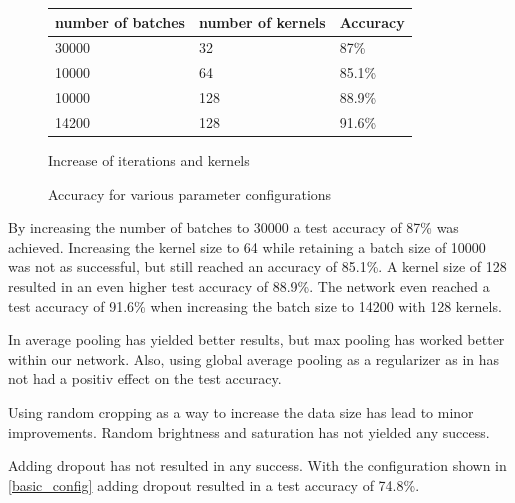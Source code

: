 \documentclass{article}
\begin{document}
\begin{enumerate}
\begin{enumerate}
\begin{item}
\begin{figure}
			\quad
			\begin{subtable}[b]{0.4\textwidth}
				\begin{tabular}{lll}
        					\toprule
        					number of batches & number of kernels    & Accuracy \\
        					\midrule
        					30000  & 32 & 87\%  \\
        					10000  & 64 & 85.1\%  \\
					10000 &128 & 88.9\%  \\
					14200  & 128 & 91.6\%  \\
					\bottomrule
     				\end{tabular}
				\caption{Increase of iterations and kernels}
				\label{kernels}
			\end{subtable}
			\caption{Accuracy for various parameter configurations}
		\end{figure}
		
			By increasing the number of batches to 30000 a test accuracy of 87\% was achieved. Increasing the kernel size to 64 while retaining a batch size of 10000 was not as successful, but still reached an accuracy of 85.1\%. A kernel size of 128 resulted in an even higher test accuracy of 88.9\%. The network even reached a test accuracy of  91.6\% when increasing the batch size to 14200 with 128 kernels.
		\end{item}
		
		
		
		
		\begin{item}
			In 
			\citet{Zagoruyko:2016aa} 
			average pooling has yielded better results, but max pooling has worked better within our network.
			Also, using global average pooling as a regularizer as in 
			\citet{Lin:2013aa} 
			has not had a positiv effect on the test accuracy.
			
		\end{item}
		
		
		
		\begin{item}
			Using random cropping as a way to increase the data size has lead to minor improvements. 
			Random brightness and saturation has not yielded any success.
		\end{item}
		
		
		
		\begin{item}
			Adding dropout has not resulted in any success. With the configuration shown in  \ref{basic_config} adding dropout resulted in a test accuracy of 74.8\%.
		\end{item}
		

\end{enumerate}
\end{enumerate}
\end{document}

